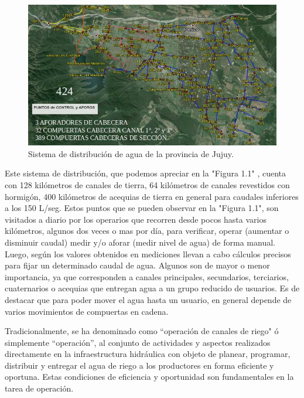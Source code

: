 \begin{figure}[h]
\centering
\includegraphics[scale=.50]{./Figures/canal.jpeg}
\caption{Sistema de distribución de agua de la provincia de Jujuy.}
\label{fig:canal}
\end{figure}

Este sistema de distribución, que podemos apreciar en la "Figura 1.1" , cuenta con 128 kilómetros de canales de tierra, 64 kilómetros de canales revestidos con hormigón, 400 kilómetros de acequias de tierra en general para caudales inferiores a los 150 L/seg.
Estos puntos que se pueden observar en la "Figura 1.1", son visitados a diario por los operarios que recorren desde pocos hasta varios kilómetros, algunos dos veces o mas por día, para verificar, operar (aumentar o disminuir caudal) medir y/o aforar (medir nivel de agua) de forma manual. Luego, según los valores obtenidos en mediciones llevan a cabo cálculos precisos para fijar un determinado caudal de agua. Algunos son de mayor o menor importancia, ya que corresponden a canales principales, secundarios, terciarios, cuaternarios o acequias que entregan agua a un grupo reducido de usuarios. Es de destacar que para poder mover el agua hasta un usuario, en general depende de varios movimientos de compuertas en cadena.

Tradicionalmente, se ha denominado como “operación de canales de riego"  ó simplemente “operación”, al conjunto de actividades y aspectos realizados directamente en
la infraestructura hidráulica con objeto de planear, programar, distribuir y entregar el agua de riego a los productores en forma eficiente y oportuna. Estas condiciones de eficiencia y oportunidad son fundamentales en la tarea de operación.

